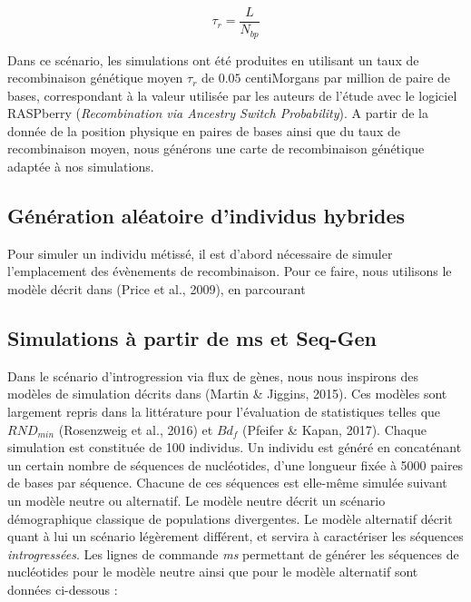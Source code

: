 \documentclass[12pt,a4paper,twoside]{ugathesis}
\theoremstyle{definition}
\theoremstyle{definition}
\theoremstyle{remark}
\begin{document}
\[\tau_r = \frac{L}{N_{bp}}\]

Dans ce scénario, les simulations ont été produites en utilisant un taux
de recombinaison génétique moyen \(\tau_r\) de \(0.05\) centiMorgans par
million de paire de bases, correspondant à la valeur utilisée par les
auteurs de l'étude avec le logiciel RASPberry
(\textit{Recombination via Ancestry Switch Probability}). A partir de la
donnée de la position physique en paires de bases ainsi que du taux de
recombinaison moyen, nous générons une carte de recombinaison génétique
adaptée à nos simulations.

\subsection{Génération aléatoire d'individus
hybrides}\label{generation-aleatoire-dindividus-hybrides}

Pour simuler un individu métissé, il est d'abord nécessaire de simuler
l'emplacement des évènements de recombinaison. Pour ce faire, nous
utilisons le modèle décrit dans (Price et al., 2009), en parcourant

\newpage

\subsection{Simulations à partir de ms et
Seq-Gen}\label{simulations-a-partir-de-ms-et-seq-gen}

Dans le scénario d'introgression via flux de gènes, nous nous inspirons
des modèles de simulation décrits dans (Martin \& Jiggins, 2015). Ces
modèles sont largement repris dans la littérature pour l'évaluation de
statistiques telles que \(RND_{min}\) (Rosenzweig et al., 2016) et
\(Bd_f\) (Pfeifer \& Kapan, 2017). Chaque simulation est constituée de
100 individus. Un individu est généré en concaténant un certain nombre
de séquences de nucléotides, d'une longueur fixée à 5000 paires de bases
par séquence. Chacune de ces séquences est elle-même simulée suivant un
modèle neutre ou alternatif. Le modèle neutre décrit un scénario
démographique classique de populations divergentes. Le modèle alternatif
décrit quant à lui un scénario légèrement différent, et servira à
caractériser les séquences \emph{introgressées}. Les lignes de commande
\emph{ms} permettant de générer les séquences de nucléotides pour le
modèle neutre ainsi que pour le modèle alternatif sont données
ci-dessous :
\end{document}
